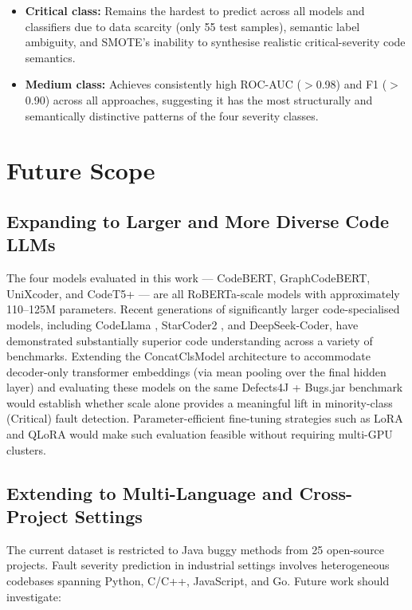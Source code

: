 \documentclass[12pt, a4paper]{report}
\begin{document}
\begin{itemize}
  \item \textbf{Critical class:} Remains the hardest to predict across all models and classifiers due to data scarcity (only 55 test samples), semantic label ambiguity, and SMOTE's inability to synthesise realistic critical-severity code semantics.

  \item \textbf{Medium class:} Achieves consistently high ROC-AUC ($>$0.98) and F1 ($>$0.90) across all approaches, suggesting it has the most structurally and semantically distinctive patterns of the four severity classes.
\end{itemize}

\clearpage
\chapter{Future Scope}

\section{Expanding to Larger and More Diverse Code LLMs}

The four models evaluated in this work --- CodeBERT, GraphCodeBERT,
UniXcoder, and CodeT5+ --- are all RoBERTa-scale models with approximately
110--125M parameters. Recent generations of significantly larger
code-specialised models, including CodeLlama \cite{codellama}, StarCoder2
\cite{starcoder2}, and DeepSeek-Coder, have demonstrated substantially
superior code understanding across a variety of benchmarks. Extending the
ConcatClsModel architecture to accommodate decoder-only transformer embeddings
(via mean pooling over the final hidden layer) and evaluating these models on
the same Defects4J + Bugs.jar benchmark would establish whether scale alone
provides a meaningful lift in minority-class (Critical) fault detection.
Parameter-efficient fine-tuning strategies such as LoRA and QLoRA would make
such evaluation feasible without requiring multi-GPU clusters.

\section{Extending to Multi-Language and Cross-Project Settings}

The current dataset is restricted to Java buggy methods from 25 open-source
projects. Fault severity prediction in industrial settings involves
heterogeneous codebases spanning Python, C/C++, JavaScript, and Go. Future
work should investigate:
\end{document}
